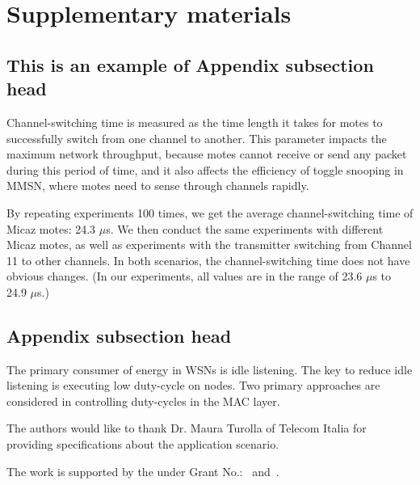 \documentclass[format=acmsmall, review=false]{acmart}
\begin{document}
\section{Supplementary materials}

	\subsection{This is an example of Appendix subsection head}
	
	Channel-switching time is measured as the time length it takes for
	motes to successfully switch from one channel to another. This
	parameter impacts the maximum network throughput, because motes
	cannot receive or send any packet during this period of time, and it
	also affects the efficiency of toggle snooping in MMSN, where motes
	need to sense through channels rapidly.
	
	By repeating experiments 100 times, we get the average
	channel-switching time of Micaz motes: 24.3 $\mu$s. We then conduct
	the same experiments with different Micaz motes, as well as
	experiments with the transmitter switching from Channel 11 to other
	channels. In both scenarios, the channel-switching time does not have
	obvious changes. (In our experiments, all values are in the range of
	23.6 $\mu$s to 24.9 $\mu$s.)
	
	\subsection{Appendix subsection head}
	
	The primary consumer of energy in WSNs is idle listening. The key to
	reduce idle listening is executing low duty-cycle on nodes. Two
	primary approaches are considered in controlling duty-cycles in the
	MAC layer.

\begin{acks}
	
	The authors would like to thank Dr. Maura Turolla of Telecom
	Italia for providing specifications about the application scenario.
	
	The work is supported by the  under Grant
	No.:~
	and~.
	
	
\end{acks}



\end{document}
